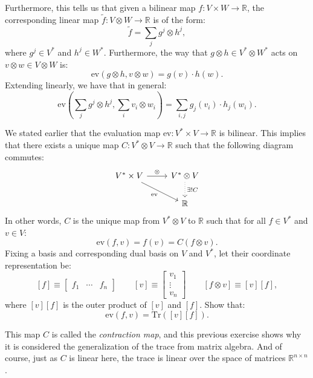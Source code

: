 Furthermore, this tells us that given a bilinear map $f: V \times W
\to \mathbb{R}$, the corresponding linear map $\tilde{f}: V \otimes W
\to \mathbb{R}$ is of the form: 
\[\tilde{f} = \sum_{j} g^j \otimes h^j,\]
where $g^j \in V^*$ and $h^j \in W^*$. Furthermore, the way that $g
\otimes h \in V^* \otimes W^*$ acts on $v \otimes w \in V\otimes W$
is: 
\[\mathrm{ev}(g \otimes h, v \otimes w) = g(v) \cdot h(w).\]
Extending linearly, we have that in general:
\[\mathrm{ev}\left(\sum_{j} g^j \otimes h^j, \sum_i v_i \otimes
w_i\right) = \sum_{i,j} g_j(v_i) \cdot h_j(w_i).\] 

\begin{exercise} We stated earlier that the evaluation map
  $\mathrm{ev}: V^* \times V \to \mathbb{R}$ is bilinear. This implies
  that there exists a unique map $C: V^* \otimes V \to \mathbb{R}$
  such that the following diagram commutes: 
\[\begin{tikzcd}
V^*\times V \arrow{r}{\otimes } \arrow[swap]{dr}{\mathrm{ev}} & V^*
\otimes V \arrow[dotted]{d}{\exists !C} \\ 
& \mathbb{R}
\end{tikzcd}\]
In other words, $C$ is the unique map from $V^* \otimes V$ to
$\mathbb{R}$ such that for all $f \in V^*$ and $v \in V$: 
\[\mathrm{ev}(f, v) = f(v) = C(f \otimes v).\]
Fixing a basis and corresponding dual basis on $V$ and $V^*$, let
their coordinate representation be: 
\[[f] \equiv \begin{bmatrix} f_1 & \dotsm &
  f_n \end{bmatrix}\quad\quad [v] \equiv \begin{bmatrix} v_1 \\ \vdots
  \\ v_n \end{bmatrix}\quad\quad [f \otimes v] \equiv [v][f],\] 
where $[v][f]$ is the outer product of $[v]$ and $[f]$. Show that:
\[\mathrm{ev}(f,v) = \mathrm{Tr}\left([v][f]\right).\]
\end{exercise}

This map $C$ is called the \emph{contraction map}, and this previous
exercise shows why it is considered the generalization of the trace
from matrix algebra. And of course, just as $C$ is linear here, the
trace is linear over the space of matrices $\mathbb{R}^{n \times n}$. 

